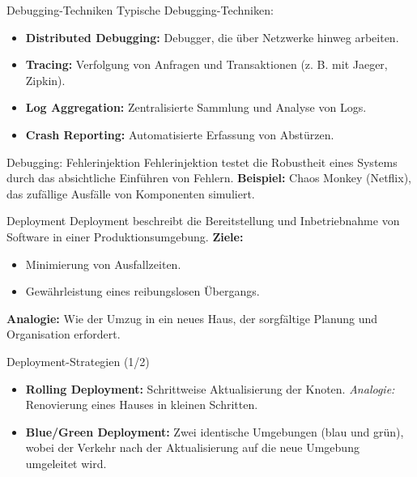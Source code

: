 \documentclass{beamer}
\begin{document}
\begin{frame}{Debugging-Techniken}
    Typische Debugging-Techniken:
    \begin{itemize}
        \item \textbf{Distributed Debugging:} Debugger, die über Netzwerke hinweg arbeiten.
        \item \textbf{Tracing:} Verfolgung von Anfragen und Transaktionen (z. B. mit Jaeger, Zipkin).
        \item \textbf{Log Aggregation:} Zentralisierte Sammlung und Analyse von Logs.
        \item \textbf{Crash Reporting:} Automatisierte Erfassung von Abstürzen.
    \end{itemize}
\end{frame}

\begin{frame}{Debugging: Fehlerinjektion}
    Fehlerinjektion testet die Robustheit eines Systems durch das absichtliche Einführen von Fehlern. \newline
    \textbf{Beispiel:} Chaos Monkey (Netflix), das zufällige Ausfälle von Komponenten simuliert.
\end{frame}

\begin{frame}{Deployment}
    Deployment beschreibt die Bereitstellung und Inbetriebnahme von Software in einer Produktionsumgebung. \newline
    \textbf{Ziele:}
    \begin{itemize}
        \item Minimierung von Ausfallzeiten.
        \item Gewährleistung eines reibungslosen Übergangs.
    \end{itemize}
    \textbf{Analogie:} Wie der Umzug in ein neues Haus, der sorgfältige Planung und Organisation erfordert.
\end{frame}

\begin{frame}{Deployment-Strategien (1/2)}
    \begin{itemize}
        \item \textbf{Rolling Deployment:} Schrittweise Aktualisierung der Knoten. \newline \textit{Analogie:} Renovierung eines Hauses in kleinen Schritten.
        \item \textbf{Blue/Green Deployment:} Zwei identische Umgebungen (blau und grün), wobei der Verkehr nach der Aktualisierung auf die neue Umgebung umgeleitet wird.
    \end{itemize}
\end{frame}
\end{document}
